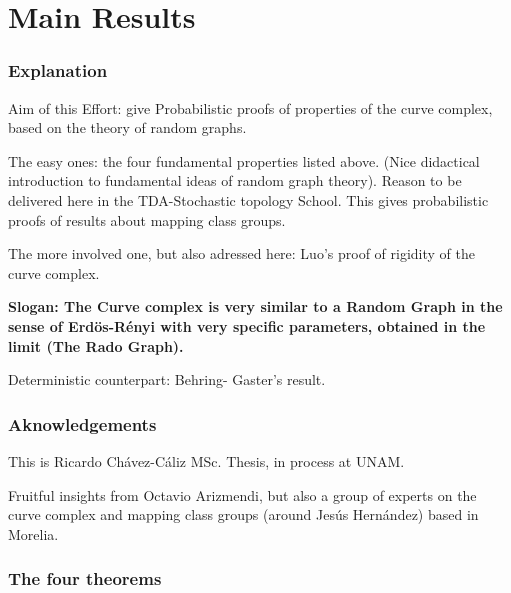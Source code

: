 \documentclass[handout]{beamer}
\theoremstyle{plain}
\begin{document}
\section{Main Results}

\begin{frame}\frametitle{Explanation}

Aim  of  this  Effort:  give  Probabilistic  proofs  of properties of  the  curve complex, based  on the  theory  of  random graphs.  \pause 




The  easy  ones: the  four  fundamental  properties  listed above. (Nice  didactical  introduction  to  fundamental   ideas  of  random graph theory). \pause Reason to be delivered here  in the  TDA-Stochastic  topology  School. \pause   
This  gives  probabilistic  proofs  of   results  about  mapping  class  groups.  \pause 

\end{frame}

\begin{frame}

The more  involved  one, but also  adressed here: Luo's proof  of  rigidity  of  the  curve  complex.  \pause 
\end{frame}
\begin{frame}

\textbf{Slogan: The  Curve  complex  is   very  similar  to  a Random Graph  in the  sense  of  Erd\"os-R\'enyi  with  very  specific  parameters,  obtained  in the  limit (The  Rado Graph). \pause }

Deterministic  counterpart: Behring- Gaster's result. 

 




\end{frame}

\begin{frame}\frametitle{Aknowledgements}

\begin{center}
This  is  Ricardo Ch\'avez-C\'aliz  MSc. Thesis, in process at  UNAM. 
\end{center}

Fruitful  insights  from  Octavio Arizmendi, \pause but  also a  group  of  experts on the  curve  complex  and  mapping class  groups (around Jes\'us Hern\'andez) based  in Morelia.

\end{frame}


\begin{frame}
\frametitle{The four theorems}
\end{frame}
\end{document}
